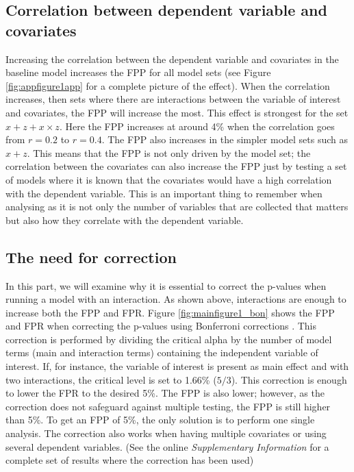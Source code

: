 \subsection{Correlation between dependent variable and covariates}
Increasing the correlation between the dependent variable and covariates in the baseline model increases the FPP for all model sets (see Figure \ref{fig:appfigure1app} for a complete picture of the effect). When the correlation increases, then sets where there are interactions between the variable of interest and covariates, the FPP will increase the most. This effect is strongest for the set $x + z+ x \times z $. Here the FPP increases at around 4\% when the correlation goes from $r=0.2$ to $r=0.4$. The FPP also increases in the simpler model sets such as $x + z$. This means that the FPP is not only driven by the model set; the correlation between the covariates can also increase the FPP just by testing a set of models where it is known that the covariates would have a high correlation with the dependent variable. This is an important thing to remember when analysing as it is not only the number of variables that are collected that matters but also how they correlate with the dependent variable. 


\subsection{The need for correction}
In this part, we will examine why it is essential to correct the p-values when running a model with an interaction. As shown above, interactions are enough to increase both the FPP and FPR. Figure \ref{fig:mainfigure1_bon} shows the FPP and FPR when correcting the p-values using Bonferroni corrections \citep{dunn1961multiple}. This correction is performed by dividing the critical alpha by the number of model terms (main and interaction terms) containing the independent variable of interest. If, for instance, the variable of interest is present as main effect and with two interactions, the critical level is set to 1.66\% ($5/3$). This correction is enough to lower the FPR to the desired 5\%. The FPP is also lower; however, as the correction does not safeguard against multiple testing, the FPP is still higher than 5\%. To get an FPP of 5\%, the only solution is to perform one single analysis. The correction also works when having multiple covariates or using several dependent variables. (See the online \textit{Supplementary Information} for a complete set of results where the correction has been used)

